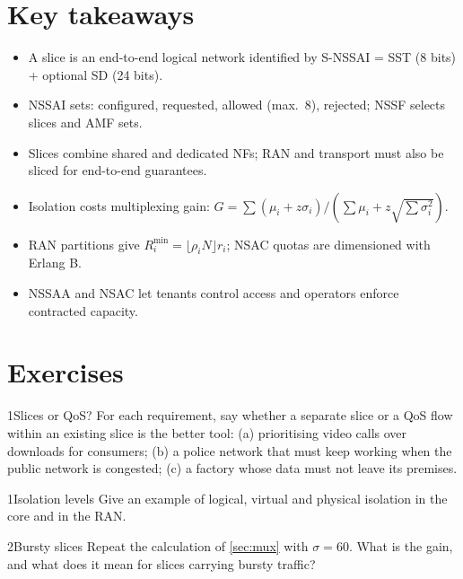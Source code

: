 \documentclass[11pt,a4paper]{article}
\begin{document}
\section{Key takeaways}
\begin{takeawaybox}
\begin{itemize}
  \item A slice is an end-to-end logical network identified by S-NSSAI = SST (8 bits) + optional SD (24 bits).
  \item NSSAI sets: configured, requested, allowed (max.\ 8), rejected; NSSF selects slices and AMF sets.
  \item Slices combine shared and dedicated NFs; RAN and transport must also be sliced for end-to-end guarantees.
  \item Isolation costs multiplexing gain: $G = \sum(\mu_i + z\sigma_i)/(\sum\mu_i + z\sqrt{\sum\sigma_i^2})$.
  \item RAN partitions give $R_i^{\min} = \lfloor\rho_i N\rfloor r_i$; NSAC quotas are dimensioned with Erlang B.
  \item NSSAA and NSAC let tenants control access and operators enforce contracted capacity.
\end{itemize}
\end{takeawaybox}

\section{Exercises}

\begin{exercisebox}{1}{Slices or QoS?}\label{exr:slqos}
For each requirement, say whether a separate slice or a QoS flow within an existing slice is the better tool: (a) prioritising video calls
over downloads for consumers; (b) a police network that must keep working when the public network is congested; (c) a factory whose data must
not leave its premises.
\end{exercisebox}

\begin{exercisebox}{1}{Isolation levels}\label{exr:iso}
Give an example of logical, virtual and physical isolation in the core and in the RAN.
\end{exercisebox}

\begin{exercisebox}{2}{Bursty slices}\label{exr:gain}
Repeat the calculation of \cref{sec:mux} with $\sigma = 60$. What is the gain, and what does it mean for slices carrying bursty traffic?
\end{exercisebox}
\end{document}

